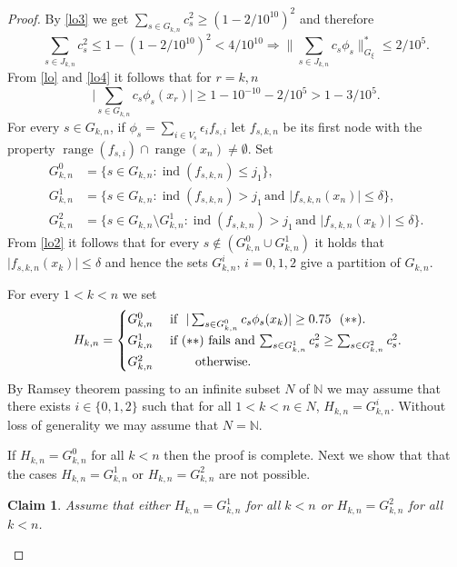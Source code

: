 \documentclass[a4paper]{amsart}
\theoremstyle{plain}
\newtheorem*{claim}{Claim}
\newcommand{\N}{\mathbb{N}}
\newcommand{\e}{\epsilon}
\DeclareMathOperator{\ran}{range}
\DeclareMathOperator{\ind}{ind}
\begin{document}
\begin{proof}
By \eqref{lo3} we get $\sum_{s\in G_{k,n}}c^{2}_{s}\geq (1-2/10^{10})^2$  and therefore
\begin{equation}\label{lo4}
\sum_{s\in J_{k,n}}c^{2}_{s}\leq 1-(1-2/10^{10})^2<4/10^{10}\Rightarrow
\|\sum_{s\in J_{k,n}}c_{s}\phi_{s}\|_{G_\xi}^*\leq 2/10^{5}.
 \end{equation}
From  \eqref{lo} and \eqref{lo4} it follows that for $r=k,n$
\begin{equation}\label{lo5}
\vert \sum_{s\in G_{k,n}}c_{s}\phi_{s}(x_{r})\vert\geq
1-10^{-10}-2/10^{5}>1-3/10^{5}.
\end{equation}
For every $s\in G_{k,n}$, if $\phi_{s}=\sum_{i\in V_{s}}\e_{i}f_{s,i}$
let $f_{s,k,n}$  be its first node  with the property $\ran(f_{s,i})\cap\ran (x_{n})\ne\emptyset$. Set
\begin{align*}
G_{k,n}^{0}&=\{s\in G_{k,n}: \ind(f_{s,k,n})\leq j_1\},
\\
G^{1}_{k,n}&=\{s\in G_{k,n}:\ind(f_{s,k,n})> j_1\,\text{and}\,\, \vert f_{s,k,n}(x_{n})\vert \leq\delta\},
\\
G_{k,n}^{2}&=\{s\in G_{k,n}\setminus G_{k,n}^{1}:\ind(f_{s,k,n})>j_1\,\text{and}\,\,\vert f_{s,k,n}(x_{k})\vert \leq\delta\}.
\end{align*}
From \eqref{lo2} it follows that for every $s\not\in(G_{k,n}^{0}\cup G_{k,n}^{1})$ it
holds that $\vert f_{s,k,n}(x_{k})\vert\leq\delta$ and hence  the sets  $G_{k,n}^i$,
$i=0,1,2$ give a partition of $G_{k,n}$.

For every $1<k<n$ we set
\begin{equation}\mbox{
$H_{k,n}=\begin{cases}
G_{k,n}^{0}\,\,&\mbox{if\,\, $\vert \sum_{s\in G_{k,n}^0}c_{s}\phi_{s}(x_k)\vert\geq 0.75\,\,\,\,(**)$}. \\
G^{1}_{k,n}\,\, &\mbox{if $(**)$ fails  and $\sum_{s\in G_{k,n}^{1}}c_{s}^2\geq\sum_{s\in G_{k,n}^{2}}c_{s}^{2}$}. \\
G_{k,n}^{2}\,\,&\mbox{\qquad otherwise.}
             \end{cases}
$}
\end{equation}
By Ramsey theorem passing to an infinite subset $N$ of $\N$ we may assume that there
exists  $i\in\{0,1,2\}$ such that for all $1<k<n\in N$, $H_{k,n}=G_{k,n}^{i}$.  Without
loss of generality we may assume that $N=\N$.

If  $H_{k,n}=G_{k,n}^{0}$ for all $k<n$ then  the proof is complete.
Next we  show that that the cases $H_{k,n}=G_{k,n}^{1}$ or $H_{k,n}=G_{k,n}^{2}$ are not possible.
\begin{claim}Assume that either $H_{k,n}=G_{k,n}^{1}$  for all $k<n$
or $H_{k,n}=G_{k,n}^{2}$ for all $k<n$.


\end{claim}
\end{proof}
\end{document}
